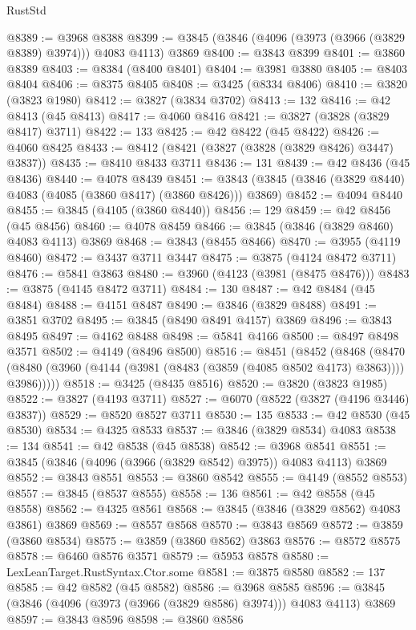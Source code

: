 \begin{lexlean}{RustStd}
\begin{coremodule}
@8389 := @3968 @8388
@8399 := @3845 (@3846 (@4096 (@3973 (@3966 (@3829 @8389) @3974))) @4083 @4113) @3869
@8400 := @3843 @8399
@8401 := @3860 @8389
@8403 := @8384 (@8400 @8401)
@8404 := @3981 @3880
@8405 := @8403 @8404
@8406 := @8375 @8405
@8408 := @3425 (@8334 @8406)
@8410 := @3820 (@3823 @1980)
@8412 := @3827 (@3834 @3702)
@8413 := 132
@8416 := @42 @8413 (@45 @8413)
@8417 := @4060 @8416
@8421 := @3827 (@3828 (@3829 @8417) @3711)
@8422 := 133
@8425 := @42 @8422 (@45 @8422)
@8426 := @4060 @8425
@8433 := @8412 (@8421 (@3827 (@3828 (@3829 @8426) @3447) @3837))
@8435 := @8410 @8433 @3711
@8436 := 131
@8439 := @42 @8436 (@45 @8436)
@8440 := @4078 @8439
@8451 := @3843 (@3845 (@3846 (@3829 @8440) @4083 (@4085 (@3860 @8417) (@3860 @8426))) @3869)
@8452 := @4094 @8440
@8455 := @3845 (@4105 (@3860 @8440))
@8456 := 129
@8459 := @42 @8456 (@45 @8456)
@8460 := @4078 @8459
@8466 := @3845 (@3846 (@3829 @8460) @4083 @4113) @3869
@8468 := @3843 (@8455 @8466)
@8470 := @3955 (@4119 @8460)
@8472 := @3437 @3711 @3447
@8475 := @3875 (@4124 @8472 @3711)
@8476 := @5841 @3863
@8480 := @3960 (@4123 (@3981 (@8475 @8476)))
@8483 := @3875 (@4145 @8472 @3711)
@8484 := 130
@8487 := @42 @8484 (@45 @8484)
@8488 := @4151 @8487
@8490 := @3846 (@3829 @8488)
@8491 := @3851 @3702
@8495 := @3845 (@8490 @8491 @4157) @3869
@8496 := @3843 @8495
@8497 := @4162 @8488
@8498 := @5841 @4166
@8500 := @8497 @8498 @3571
@8502 := @4149 (@8496 @8500)
@8516 := @8451
    (@8452
      (@8468
        (@8470 (@8480 (@3960 (@4144 (@3981 (@8483 (@3859 (@4085 @8502 @4173) @3863)))) @3986)))))
@8518 := @3425 (@8435 @8516)
@8520 := @3820 (@3823 @1985)
@8522 := @3827 (@4193 @3711)
@8527 := @6070 (@8522 (@3827 (@4196 @3446) @3837))
@8529 := @8520 @8527 @3711
@8530 := 135
@8533 := @42 @8530 (@45 @8530)
@8534 := @4325 @8533
@8537 := @3846 (@3829 @8534) @4083
@8538 := 134
@8541 := @42 @8538 (@45 @8538)
@8542 := @3968 @8541
@8551 := @3845 (@3846 (@4096 (@3966 (@3829 @8542) @3975)) @4083 @4113) @3869
@8552 := @3843 @8551
@8553 := @3860 @8542
@8555 := @4149 (@8552 @8553)
@8557 := @3845 (@8537 @8555)
@8558 := 136
@8561 := @42 @8558 (@45 @8558)
@8562 := @4325 @8561
@8568 := @3845 (@3846 (@3829 @8562) @4083 @3861) @3869
@8569 := @8557 @8568
@8570 := @3843 @8569
@8572 := @3859 (@3860 @8534)
@8575 := @3859 (@3860 @8562) @3863
@8576 := @8572 @8575
@8578 := @6460 @8576 @3571
@8579 := @5953 @8578
@8580 := LexLeanTarget.RustSyntax.Ctor.some
@8581 := @3875 @8580
@8582 := 137
@8585 := @42 @8582 (@45 @8582)
@8586 := @3968 @8585
@8596 := @3845 (@3846 (@4096 (@3973 (@3966 (@3829 @8586) @3974))) @4083 @4113) @3869
@8597 := @3843 @8596
@8598 := @3860 @8586

\end{coremodule}
\end{lexlean}
